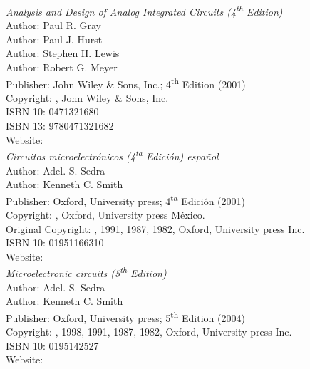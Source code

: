 \begin{thebibliography}{9}
\emph{Analysis and Design of Analog Integrated Circuits (4\textsuperscript{th} Edition)}\\
Author: Paul R. Gray\\
Author: Paul J. Hurst\\
Author: Stephen H. Lewis\\
Author: Robert G. Meyer\\
Publisher: John Wiley \& Sons, Inc.; 4\textsuperscript{th} Edition (2001)\\
Copyright: \textcopyright {}, John Wiley \& Sons, Inc.\\
ISBN 10: 0471321680\\
ISBN 13: 9780471321682\\
Website: \\




\emph{Circuitos microelectrónicos (4\textsuperscript{ta} Edición) español}\\
Author: Adel. S. Sedra\\
Author: Kenneth C. Smith\\
Publisher: Oxford, University press; 4\textsuperscript{ta} Edición (2001)\\
Copyright: \textcopyright {}, Oxford, University press México.\\
Original Copyright: \textcopyright {}, 1991, 1987, 1982, Oxford, University press Inc.\\
ISBN 10: 01951166310\\
Website: \\




\emph{Microelectronic circuits (5\textsuperscript{th} Edition)}\\
Author: Adel. S. Sedra\\
Author: Kenneth C. Smith\\
Publisher: Oxford, University press; 5\textsuperscript{th} Edition (2004)\\
Copyright: \textcopyright {}, 1998, 1991, 1987, 1982, Oxford, University press Inc.\\
ISBN 10: 0195142527\\
Website: \\





\end{thebibliography}
